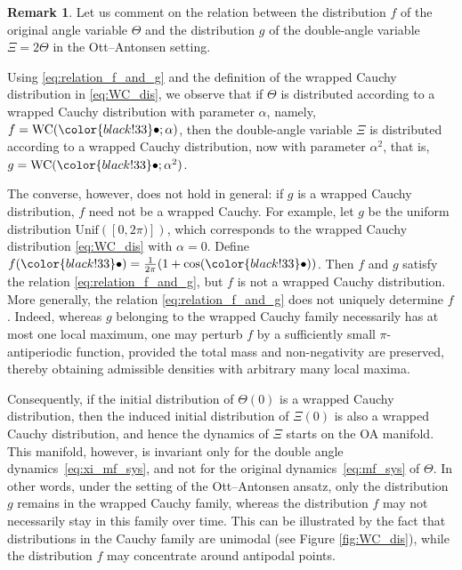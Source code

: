 \documentclass[10pt]{article}
\theoremstyle{definition}
\theoremstyle{definition}
\newtheorem{remark}[theorem]{Remark}
\numberwithin{equation}{section}
\newcommand{\blue}{\color{blue}}
\newcommand{\dummy}{\mathord{\color{black!33}\bullet}}
\newcommand{\WC}{\mathrm{WC}}
\newcommand{\JM}[1]{\marginpar{\scriptsize\textcolor{teal}{JM: {#1}}}}
\newcommand{\JPN}[1]{\marginpar{\scriptsize{JP: {#1}}}}
\begin{document}
 
\begin{remark}\label{rem:g_and_f_wrapped_Cauchy}
Let us comment on the relation between the distribution $f$ of the original angle variable $\Theta$ and the distribution $g$ of the double-angle variable $\Xi = 2\Theta$ in the Ott--Antonsen setting.

Using \eqref{eq:relation_f_and_g} and the definition of the wrapped Cauchy distribution in \eqref{eq:WC_dis}, we observe that if $\Theta$ is distributed according to a wrapped Cauchy distribution with parameter $\alpha$, namely, $f = \WC (\dummy; \alpha)$, then the double-angle variable $\Xi$ is distributed according to a wrapped Cauchy distribution, now with parameter $\alpha^2$, that is, $g = \WC(\dummy; \alpha^2)$. 

The converse, however, does not hold in general: if $g$ is a wrapped Cauchy distribution, $f$ need not be a wrapped Cauchy.
For example, let $g$ be the uniform distribution $\mathrm{Unif}([0,2\pi)])$, which corresponds to the wrapped Cauchy distribution \eqref{eq:WC_dis} with $\alpha = 0$.
Define $f(\dummy) = \frac{1}{2\pi} (1 + \cos(\dummy))$.
Then $f$ and $g$ satisfy the relation \eqref{eq:relation_f_and_g}, but $f$ is not a wrapped Cauchy distribution.
More generally, the relation \eqref{eq:relation_f_and_g} does not uniquely determine $f$.
Indeed, whereas $g$ belonging to the wrapped Cauchy family necessarily has at most one local maximum, one may perturb $f$ by a sufficiently small $\pi$-antiperiodic function, provided the total mass and non-negativity are preserved, thereby obtaining admissible densities with arbitrary many local maxima.

Consequently, if the initial distribution of $\Theta(0)$ is a wrapped Cauchy distribution, then the induced initial distribution of $\Xi(0)$ is also a wrapped Cauchy distribution, and hence the dynamics of $\Xi$ starts on the OA manifold.
This manifold, however, is invariant only for the double angle dynamics~\eqref{eq:xi_mf_sys}, and not for the original dynamics~\eqref{eq:mf_sys} of $\Theta$.
In other words, under the setting of the Ott--Antonsen ansatz, only the distribution $g$ remains in the wrapped Cauchy family, whereas the distribution $f$ may not necessarily stay in this family over time. This can be illustrated by the fact that distributions in the Cauchy family are unimodal (see Figure \ref{fig:WC_dis}), while the distribution $f$ may concentrate around antipodal points.  
\end{remark}
\end{document}
